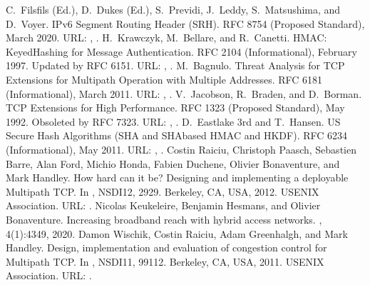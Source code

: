 \documentclass[letterpaper,10pt,english]{sphinxmanual}
\begin{document}
\begin{sphinxthebibliography}{10}
\sphinxAtStartPar
C. Filsfils (Ed.), D. Dukes (Ed.), S. Previdi, J. Leddy, S. Matsushima, and D. Voyer. IPv6 Segment Routing Header (SRH). RFC 8754 (Proposed Standard), March 2020. URL: , .
\sphinxAtStartPar
H. Krawczyk, M. Bellare, and R. Canetti. HMAC: Keyed\sphinxhyphen{}Hashing for Message Authentication. RFC 2104 (Informational), February 1997. Updated by RFC 6151. URL: , .
\sphinxAtStartPar
M. Bagnulo. Threat Analysis for TCP Extensions for Multipath Operation with Multiple Addresses. RFC 6181 (Informational), March 2011. URL: , .
\sphinxAtStartPar
V. Jacobson, R. Braden, and D. Borman. TCP Extensions for High Performance. RFC 1323 (Proposed Standard), May 1992. Obsoleted by RFC 7323. URL: , .
\sphinxAtStartPar
D. Eastlake 3rd and T. Hansen. US Secure Hash Algorithms (SHA and SHA\sphinxhyphen{}based HMAC and HKDF). RFC 6234 (Informational), May 2011. URL: , .
\sphinxAtStartPar
Costin Raiciu, Christoph Paasch, Sebastien Barre, Alan Ford, Michio Honda, Fabien Duchene, Olivier Bonaventure, and Mark Handley. How hard can it be? Designing and implementing a deployable Multipath TCP. In , NSDI\textquotesingle{}12, 29\textendash{}29. Berkeley, CA, USA, 2012. USENIX Association. URL: .
\sphinxAtStartPar
Nicolas Keukeleire, Benjamin Hesmans, and Olivier Bonaventure. Increasing broadband reach with hybrid access networks. , 4(1):43\textendash{}49, 2020.
\sphinxAtStartPar
Damon Wischik, Costin Raiciu, Adam Greenhalgh, and Mark Handley. Design, implementation and evaluation of congestion control for Multipath TCP. In , NSDI\textquotesingle{}11, 99\textendash{}112. Berkeley, CA, USA, 2011. USENIX Association. URL: .

\end{sphinxthebibliography}
\end{document}
